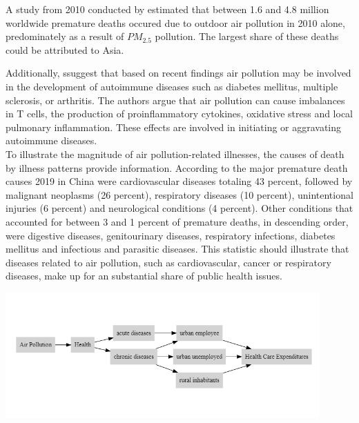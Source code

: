 \documentclass[
]{article}
\begin{document}
	A study from 2010 conducted by \cite{LEL2015} estimated that between 1.6 and 4.8 million worldwide premature deaths occured due to outdoor air pollution in 2010 alone, predominately as a result of $PM_2.5$ pollution. The largest share of these deaths could be attributed to Asia. 
	
	Additionally, \cite{zhao2019emerging} ssuggest that based on recent findings air pollution may be involved in the development of autoimmune diseases such as diabetes mellitus, multiple sclerosis, or arthritis. The authors argue that air pollution can cause imbalances in T cells, the production of proinflammatory cytokines, oxidative stress and local pulmonary inflammation. These effects are involved in initiating or aggravating autoimmune diseases. \\ 
	
	To illustrate the magnitude of air pollution-related illnesses, the causes of death by illness patterns provide information. According to \cite{who_nodate} the major premature death causes 2019 in China were cardiovascular diseases totaling 43 percent, followed by malignant neoplasms (26 percent), respiratory diseases (10 percent), unintentional injuries (6 percent) and neurological conditions (4 percent). Other conditions that accounted for between 3 and 1 percent of premature deaths, in descending order, were digestive diseases, genitourinary diseases, respiratory infections, diabetes mellitus and infectious and parasitic diseases. This statistic should illustrate that diseases related to air pollution, such as cardiovascular, cancer or respiratory diseases, make up for an substantial share of public health issues. \\ 
	
	\begin{center}
		\includegraphics[width=0.9\textwidth]{DAG_true.png} 
		\label{fig:dag}
	\end{center}
\end{document}
